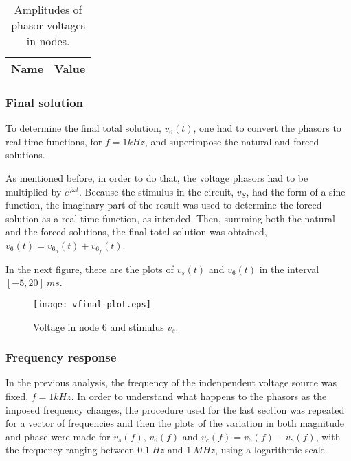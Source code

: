 



\begin{table}[H]
  \centering
  \begin{tabular}{|c|c|}
    \hline    
    {\bf Name} & {\bf Value} \\ \hline
    
  \end{tabular}
  \caption{Amplitudes of phasor voltages in nodes.}
  \label{tab:forced_amp}
\end{table}


\subsubsection{Final solution}  %
To determine the final total solution, $v_6(t)$, one had to convert the phasors to real time functions, for $f=1kHz$, and superimpose the natural and forced solutions.
\par
As mentioned before, in order to do that, the voltage phasors had to be multiplied by $e^{j \omega t}$. Because the stimulus in the circuit, $v_S$, had the form of a sine function, the imaginary part of the result was used to determine the forced solution as a real time function, as intended.
Then, summing both the natural and the forced solutions, the final total solution was obtained, $v_6(t) = v_{6_n} (t) + v_{6_f} (t)$.
\par
In the next figure, there are the plots of $v_s(t)$ and $v_6(t)$ in the interval $[-5, 20] \ ms$.


\begin{figure}[H] \centering
\texttt{[image: vfinal\_plot.eps]}
\caption{Voltage in node 6 and stimulus $v_s$.}
\label{fig:final}
\end{figure}



\subsubsection{Frequency response}  %
In the previous analysis, the frequency of the indenpendent voltage source was fixed, $f=1kHz$. In order to understand what happens to the phasors as the imposed frequency changes, the procedure used for the last section was repeated for a vector of frequencies and then the plots of the variation in both magnitude and phase were made for $v_s(f)$, $v_6(f)$ and $v_c(f) = v_6(f)-v_8(f)$, with the frequency ranging between $0.1 \ Hz$ and $1 \ MHz$, using a logarithmic scale.

